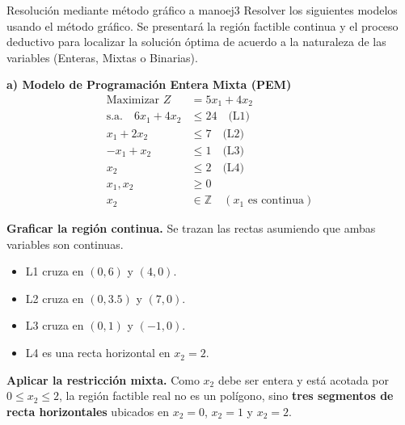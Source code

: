 \documentclass[10pt,a4paper]{article}
\begin{document}
\newpage

\begin{ejercicio}{Resolución mediante método gráfico a mano}{ej3}
Resolver los siguientes modelos usando el método gráfico. 
Se presentará la región factible continua y el proceso deductivo para localizar la solución óptima de acuerdo a la naturaleza de las variables (Enteras, Mixtas o Binarias).
\end{ejercicio}



\vspace{0.4cm}
\textbf{\large a) Modelo de Programación Entera Mixta (PEM)}
\begin{align*}
    \text{Maximizar } Z &= 5x_1 + 4x_2 \\
    \text{s.a.} \quad 
    6x_1 + 4x_2 &\le 24 \quad \text{(L1)} \\
    x_1 + 2x_2 &\le 7 \quad \text{(L2)} \\
    -x_1 + x_2 &\le 1 \quad \text{(L3)} \\
    x_2 &\le 2 \quad \text{(L4)} \\
    x_1, x_2 &\ge 0 \\
    x_2 &\in \mathbb{Z} \quad (x_1 \text{ es continua})
\end{align*}

\textbf{Graficar la región continua.} Se trazan las rectas asumiendo que ambas variables son 
continuas.
\begin{itemize}
    \item L1 cruza en $(0, 6)$ y $(4, 0)$.
    \item L2 cruza en $(0, 3.5)$ y $(7, 0)$.
    \item L3 cruza en $(0, 1)$ y $(-1, 0)$.
    \item L4 es una recta horizontal en $x_2 = 2$.
\end{itemize}

\textbf{Aplicar la restricción mixta.} Como $x_2$ debe ser entera y está acotada 
por $0 \le x_2 \le 2$, la región factible real no es un polígono, 
sino \textbf{tres segmentos de recta horizontales} 
ubicados en $x_2 = 0$, $x_2 = 1$ y $x_2 = 2$.
\end{document}
